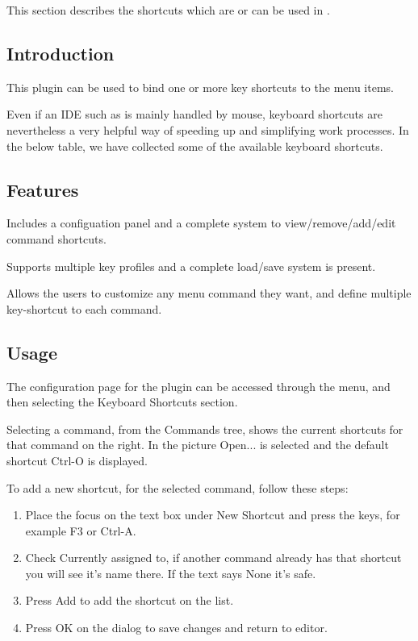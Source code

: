 This section describes the shortcuts which are or can be used in \codeblocks.

\subsection{Introduction}

This plugin can be used to bind one or more key shortcuts to the menu items.

Even if an IDE such as \codeblocks is mainly handled by mouse, keyboard shortcuts are nevertheless a very helpful way of speeding up and simplifying work processes. In the below table, we have collected some of the available keyboard shortcuts.

\subsection{Features}
\begin{description}
\item Includes a configuation panel and a complete system to view/remove/add/edit command shortcuts.
\item Supports multiple key profiles and a complete load/save system is present.
\item Allows the users to customize any menu command they want, and define multiple key-shortcut to each command.
\end{description}

\subsection{Usage}

The configuration page for the plugin can be accessed through the  menu, and then selecting the Keyboard Shortcuts section.


Selecting a command, from the Commands tree, shows the current shortcuts for that command on the right. In the picture Open... is selected and the default shortcut Ctrl-O is displayed.

To add a new shortcut, for the selected command, follow these steps:

\begin{enumerate}
\item Place the focus on the text box under New Shortcut and press the keys, for example F3 or Ctrl-A.
\item Check Currently assigned to, if another command already has that shortcut you will see it's name there. If the text says None it's safe.
\item Press Add to add the shortcut on the list.
\item Press OK on the dialog to save changes and return to editor.
\end{enumerate}
    

